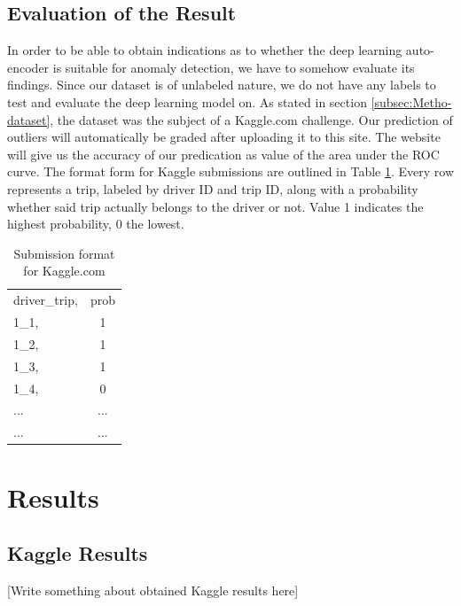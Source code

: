 \documentclass{vldb}
\begin{document}
\subsection{Evaluation of the Result}
\label{subsec:eval-result}
In order to be able to obtain indications as to whether the deep learning auto-encoder is suitable for anomaly detection, we have to somehow evaluate its findings. Since our dataset is of unlabeled nature, we do not have any labels to test and evaluate the deep learning model on. As stated in section \ref{subsec:Metho-dataset}, the dataset was the subject of a Kaggle.com challenge. Our prediction of outliers will automatically be graded after uploading it to this site. The website will give us the accuracy of our predication as value of the area under the ROC curve. 
The format form for Kaggle submissions are outlined in Table \ref{table:kaggle-submission}. Every row represents a trip, labeled by driver ID and trip ID, along with a probability whether said trip actually belongs to the driver or not. Value 1 indicates the highest probability, 0 the lowest.
\begin{table}
\centering
\begin{tabular}{l c}
driver\_trip, & prob\\
1\_1,& 1\\
1\_2,& 1\\
1\_3,& 1\\
1\_4,& 0\\
... & ... \\
... & ... \\
\end{tabular}
\caption{Submission format for Kaggle.com}
\label{table:kaggle-submission}
\end{table}


\section{Results}
\label{sec:Results}

\subsection{Kaggle Results}
[Write something about obtained Kaggle results here]
\end{document}
